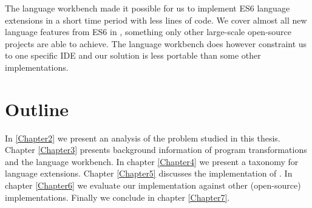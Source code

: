 The language workbench made it possible for us to implement ES6 language extensions in a short time period with less lines of code. We cover almost all new language features from ES6 in \projectname, something only other large-scale open-source projects are able to achieve. The language workbench does however constraint us to one specific IDE and our solution is less portable than some other implementations.

\section{Outline}
In \ref{Chapter2} we present an analysis of the problem studied in this thesis. Chapter \ref{Chapter3} presents background information of program transformations and the language workbench. In chapter \ref{Chapter4} we present a taxonomy for language extensions.  Chapter \ref{Chapter5} discusses the implementation of \projectname. In chapter \ref{Chapter6} we evaluate our implementation against other (open-source) implementations. Finally we conclude in chapter \ref{Chapter7}.